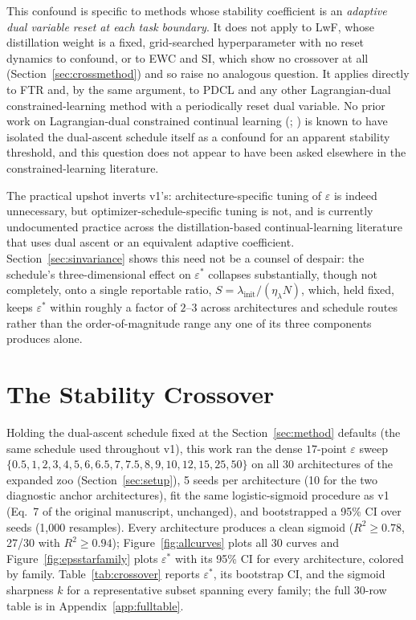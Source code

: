 \documentclass[11pt]{article}
\newcommand{\eps}{\varepsilon}
\newcommand{\epsstar}{\eps^{*}}
\begin{document}
This confound is specific to methods whose stability coefficient is an
\emph{adaptive dual variable reset at each task boundary}. It does not apply
to LwF, whose distillation weight is a fixed, grid-searched hyperparameter
with no reset dynamics to confound, or to EWC and SI, which show no
crossover at all (Section~\ref{sec:crossmethod}) and so raise no analogous
question. It applies directly to FTR and, by the same argument, to PDCL
\citep{elenter2023primal} and any other Lagrangian-dual constrained-learning
method with a periodically reset dual variable. No prior
work on Lagrangian-dual constrained continual learning
(\citealp{elenter2023primal}; \citealp{chamon2023constrained,elenter2024nearoptimal,hounie2023resilient})
is known to have isolated the dual-ascent schedule itself as a confound for an apparent
stability threshold, and this question does not appear to have been asked
elsewhere in the constrained-learning literature.

The practical upshot inverts v1's: architecture-specific tuning of $\eps$ is
indeed unnecessary, but optimizer-schedule-specific tuning is not, and is
currently undocumented practice across the distillation-based
continual-learning literature that uses dual ascent or an equivalent
adaptive coefficient. Section~\ref{sec:sinvariance} shows this need not be a
counsel of despair: the schedule's three-dimensional effect on $\epsstar$
collapses substantially, though not completely, onto a single reportable
ratio, $S=\lambda_{\mathrm{init}}/(\eta_\lambda N)$, which, held fixed,
keeps $\epsstar$ within roughly a factor of $2$--$3$ across architectures
and schedule routes rather than the order-of-magnitude range any one of its
three components produces alone.

\section{The Stability Crossover}
\label{sec:crossover}

Holding the dual-ascent schedule fixed at the Section~\ref{sec:method}
defaults (the same schedule used throughout v1), this work ran the dense $17$-point
$\eps$ sweep $\{0.5,1,2,3,4,5,6,6.5,7,7.5,8,9,10,12,15,25,50\}$ on all 30
architectures of the expanded zoo (Section~\ref{sec:setup}), 5 seeds per
architecture (10 for the two diagnostic anchor architectures), fit the same
logistic-sigmoid procedure as v1 (Eq.~7 of the original manuscript,
unchanged), and bootstrapped a 95\% CI over seeds (1{,}000 resamples). Every
architecture produces a clean sigmoid ($R^2 \ge 0.78$, 27/30 with
$R^2\ge0.94$); Figure~\ref{fig:allcurves} plots all 30 curves and
Figure~\ref{fig:epsstarfamily} plots $\epsstar$ with its 95\% CI for every
architecture, colored by family. Table~\ref{tab:crossover}
reports $\epsstar$, its bootstrap CI, and the sigmoid sharpness $k$ for a
representative subset spanning every family; the full 30-row table is in
Appendix~\ref{app:fulltable}.
\end{document}
